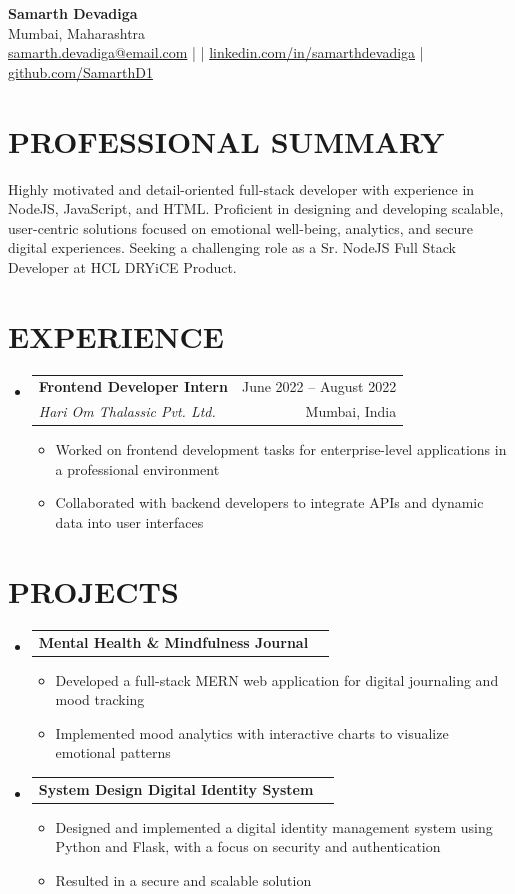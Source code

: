 \documentclass[letterpaper,11pt]{article}
\makeatletter
\newcommand{\resumeItem}[1]{
  \item\small{
    {#1 \vspace{-1pt}}
  }
}
\newcommand{\resumeSubheading}[4]{
  \vspace{-1pt}\item
    \begin{tabular*}{\textwidth}[t]{l@{\extracolsep{\fill}}r}
      \textbf{#1} & {\color{dark-grey}\small #2}\vspace{1pt}\\
      \textit{#3} & {\color{dark-grey} \small #4}\\
    \end{tabular*}\vspace{-4pt}
}
\newcommand{\resumeProjectHeading}[2]{
    \item
    \begin{tabular*}{\textwidth}{l@{\extracolsep{\fill}}r}
      #1 & {\color{dark-grey}} \\
    \end{tabular*}\vspace{-4pt}
}
\newcommand{\resumeSubHeadingListStart}{\begin{itemize}[leftmargin=0in, label={}]}
\newcommand{\resumeSubHeadingListEnd}{\end{itemize}}
\newcommand{\resumeItemListStart}{\begin{itemize}}
\newcommand{\resumeItemListEnd}{\end{itemize}\vspace{0pt}}
\makeatother
\begin{document}
\begin{center}
    {\LARGE \textbf{Samarth Devadiga}}\\[2mm]
    Mumbai, Maharashtra \\
    \href{mailto:}{samarth.devadiga@email.com} \quad |  \quad | \quad
    \href{https://www.linkedin.com/in/samarthdevadiga}{linkedin.com/in/samarthdevadiga} \quad | \quad
    \href{https://github.com/SamarthD1}{github.com/SamarthD1}
\end{center}

\section{PROFESSIONAL SUMMARY}
Highly motivated and detail-oriented full-stack developer with experience in NodeJS, JavaScript, and HTML. Proficient in designing and developing scalable, user-centric solutions focused on emotional well-being, analytics, and secure digital experiences. Seeking a challenging role as a Sr. NodeJS Full Stack Developer at HCL DRYiCE Product.

\section{EXPERIENCE}
  \resumeSubHeadingListStart
    \resumeSubheading
      {Frontend Developer Intern}{June 2022 -- August 2022}
      {Hari Om Thalassic Pvt. Ltd.}{Mumbai, India}
      \resumeItemListStart
        \resumeItem{Worked on frontend development tasks for enterprise-level applications in a professional environment}
        \resumeItem{Collaborated with backend developers to integrate APIs and dynamic data into user interfaces}
      \resumeItemListEnd
  \resumeSubHeadingListEnd

\section{PROJECTS}
    \resumeSubHeadingListStart
      \resumeProjectHeading
          {\textbf{Mental Health \& Mindfulness Journal}} {June 2022}
          \resumeItemListStart
            \resumeItem{Developed a full-stack MERN web application for digital journaling and mood tracking}
            \resumeItem{Implemented mood analytics with interactive charts to visualize emotional patterns}
          \resumeItemListEnd
      \resumeProjectHeading
          {\textbf{System Design Digital Identity System}} {August 2022}
          \resumeItemListStart
            \resumeItem{Designed and implemented a digital identity management system using Python and Flask, with a focus on security and authentication}
            \resumeItem{Resulted in a secure and scalable solution}
          \resumeItemListEnd
    \resumeSubHeadingListEnd
\end{document}

